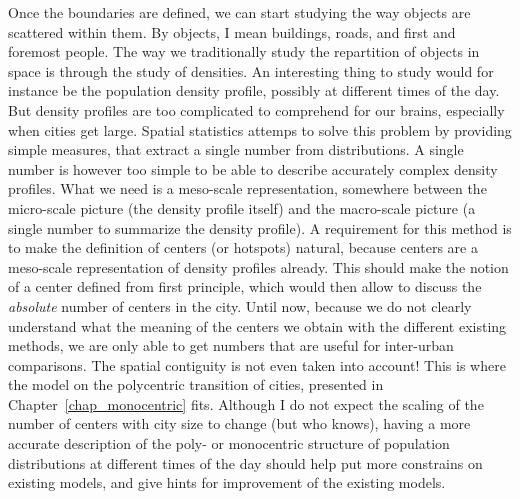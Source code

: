 Once the boundaries are defined, we can start studying the way objects are
scattered within them. By objects, I mean buildings, roads, and first and
foremost people. The way we traditionally study the repartition of objects in
space is through the study of densities. An interesting thing to study would for
instance be the population density profile, possibly at different times of the
day. But density profiles are too complicated to comprehend for our brains,
especially when cities get large. Spatial statistics attemps to solve this
problem by providing simple measures, that extract a single number from
distributions. A single number is however too simple to be able to describe
accurately complex density profiles. What we need is a meso-scale
representation, somewhere between the micro-scale picture (the density profile
itself) and the macro-scale picture (a single number to summarize the density
profile). A requirement for this method is to make the definition of centers (or
hotspots) natural, because centers are a meso-scale representation of density
profiles already. This should make the notion of a center defined from first
principle, which would then allow to discuss the \emph{absolute} number of
centers in the city. Until now, because we do not clearly understand what the
meaning of the centers we obtain with the different existing methods, we are
only able to get numbers that are useful for inter-urban comparisons. The
spatial contiguity is not even taken into account!  This is where the model on
the polycentric transition of cities, presented in
Chapter~\ref{chap_monocentric} fits. Although I do not expect the scaling of the
number of centers with city size to change (but who knows), having a more
accurate description of the poly- or monocentric structure of population
distributions at different times of the day should help put more constrains on
existing models, and give hints for improvement of the existing models.\\



